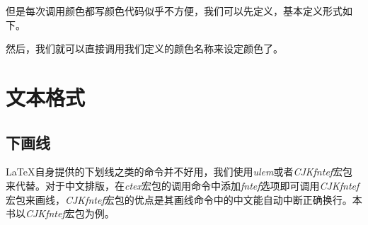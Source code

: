 \begin{center}
    \color[RGB]{204, 128, 92}{Color Text中文测试}
\end{center}

\begin{latex}
\color[RGB]{204, 128, 92}{Color Text中文测试}
\end{latex}

但是每次调用颜色都写颜色代码似乎不方便，我们可以先定义，基本定义形式如下。
\begin{latex}
\usepackage{xcolor}                                    %
\end{latex}

然后，我们就可以直接调用我们定义的颜色名称来设定颜色了。

\begin{center}
\end{center}

\begin{latex}
\color{keyword}{\slshape function, return, if, true, false}
\end{latex}

\section{文本格式}

\subsection{下画线}

\LaTeX 自身提供的下划线之类的命令并不好用，我们使用\emph{ulem}或者\emph{CJKfntef}宏包来代替。对于中文排版，在\emph{ctex}宏包的调用命令中添加\emph{fntef}选项即可调用\emph{CJKfntef}宏包来画线，\emph{CJKfntef}宏包的优点是其画线命令中的中文能自动中断正确换行。本书以\emph{CJKfntef}宏包为例。

\begin{codeshow}
\\
\\
\\
\\
\\
\end{codeshow}

